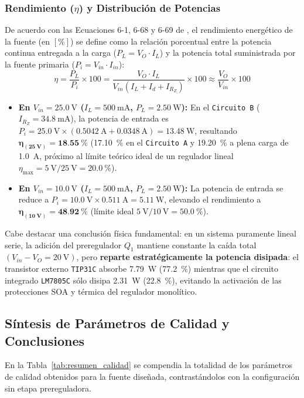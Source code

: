 \subsubsection{Rendimiento ($\eta$) y Distribución de Potencias}
De acuerdo con las Ecuaciones 6-1, 6-68 y 6-69 de \cite{gonzalez_p2}, el rendimiento energético de la fuente (en $[\%]$) se define como la relación porcentual entre la potencia continua entregada a la carga ($P_L = V_O \cdot I_L$) y la potencia total suministrada por la fuente primaria ($P_i = V_{in} \cdot I_{in}$):
\begin{equation}
    \eta = \frac{P_L}{P_i} \times 100 = \frac{V_O \cdot I_L}{V_{in} \left(I_L + I_d + I_{R_Z}\right)} \times 100 \approx \frac{V_O}{V_{in}} \times 100
    \label{eq:rendimiento}
\end{equation}
\begin{itemize}
    \item \textbf{En $V_{in} = \SI{25,0}{\volt}$ ($I_L = \SI{500}{\milli\ampere}$, $P_L = \SI{2,50}{\watt}$):} En el \texttt{Circuito B} ($I_{R_Z} = \SI{34,8}{\milli\ampere}$), la potencia de entrada es $P_i = \SI{25,0}{\volt} \times (\SI{0,5042}{\ampere} + \SI{0,0348}{\ampere}) = \SI{13,48}{\watt}$, resultando $\mathbf{\eta_{(\SI{25}{\volt})} = \SI{18,55}{\percent}}$ (\SI{17,10}{\percent} en el \texttt{Circuito A} y \SI{19,20}{\percent} a plena carga de \SI{1,0}{\ampere}, próximo al límite teórico ideal de un regulador lineal $\eta_{\max} = \SI{5}{\volt}/\SI{25}{\volt} = \SI{20,0}{\percent}$).
    \item \textbf{En $V_{in} = \SI{10,0}{\volt}$ ($I_L = \SI{500}{\milli\ampere}$, $P_L = \SI{2,50}{\watt}$):} La potencia de entrada se reduce a $P_i = \SI{10,0}{\volt} \times \SI{0,511}{\ampere} = \SI{5,11}{\watt}$, elevando el rendimiento a $\mathbf{\eta_{(\SI{10}{\volt})} = \SI{48,92}{\percent}}$ (límite ideal $\SI{5}{\volt}/\SI{10}{\volt} = \SI{50,0}{\percent}$).
\end{itemize}
Cabe destacar una conclusión física fundamental: en un sistema puramente lineal serie, la adición del preregulador $Q_1$ mantiene constante la caída total $(V_{in} - V_O = \SI{20}{\volt})$, pero \textbf{reparte estratégicamente la potencia disipada}: el transistor externo \texttt{TIP31C} absorbe \SI{7,79}{\watt} (\SI{77,2}{\percent}) mientras que el circuito integrado \texttt{LM7805C} sólo disipa \SI{2,31}{\watt} (\SI{22,8}{\percent}), evitando la activación de las protecciones SOA y térmica del regulador monolítico.

\subsection{Síntesis de Parámetros de Calidad y Conclusiones}
En la Tabla~\ref{tab:resumen_calidad} se compendia la totalidad de los parámetros de calidad obtenidos para la fuente diseñada, contrastándolos con la configuración sin etapa prereguladora.

